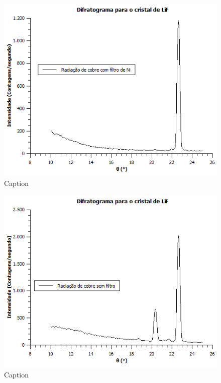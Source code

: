 \documentclass[article,12pt,openright,oneside,a4paper,brazil]{abntex2}
\begin{document}
\begin{figure}[H]
    \centering
    \includegraphics[scale=0.8]{Figuras/FiltroNi.png}
    \caption{Caption}
    \label{fig:my_label}
\end{figure}


\begin{figure}[H]
    \centering
    \includegraphics[scale=0.8]{Figuras/Semfiltro.png}
    \caption{Caption}
    \label{fig:my_label}
\end{figure}
\end{document}
